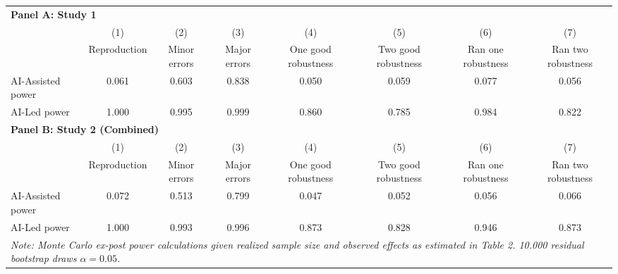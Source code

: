 \begin{tabular}{l*{7}{c}}
\hline\hline
\multicolumn{8}{l}{\textbf{Panel A: Study 1}}\\
& (1) & (2) & (3) & (4) & (5) & (6) & (7)\\
                    &Reproduction   &Minor errors   &Major errors   &One good robustness   &Two good robustness   &Ran one robustness   &Ran two robustness   \\
\hline
AI-Assisted power    &0.061 & 0.603 & 0.838 & 0.050 & 0.059 & 0.077 & 0.056 \\
AI-Led power         &1.000 & 0.995 & 0.999 & 0.860 & 0.785 & 0.984 & 0.822 \\
\hline
\multicolumn{8}{l}{\textbf{Panel B: Study 2 (Combined)}}\\
& (1) & (2) & (3) & (4) & (5) & (6) & (7)\\
                    &Reproduction   &Minor errors   &Major errors   &One good robustness   &Two good robustness   &Ran one robustness   &Ran two robustness   \\
\hline
AI-Assisted power    &0.072 & 0.513 & 0.799 & 0.047 & 0.052 & 0.056 & 0.066 \\
AI-Led power         &1.000 & 0.993 & 0.996 & 0.873 & 0.828 & 0.946 & 0.873 \\
\hline
\hline\hline
\multicolumn{8}{l}{\it{Note:} Monte Carlo ex-post power calculations given realized sample size and observed effects as estimated in Table 2. 10.000 residual bootstrap draws \(\alpha = 0.05\).}\\
\end{tabular}
